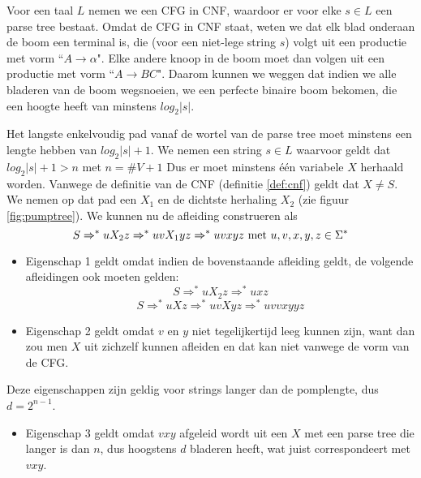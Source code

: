  Voor een taal $L$ nemen we een CFG in CNF, waardoor er voor elke $s \in L$ een parse tree bestaat. Omdat de CFG in CNF staat, weten we dat elk blad onderaan de boom een terminal is, die (voor een niet-lege string $s$) volgt uit een productie met vorm ``$A \rightarrow \alpha$". Elke andere knoop in de boom moet dan volgen uit een productie met vorm ``$A \rightarrow BC$". Daarom kunnen we weggen dat indien we alle bladeren van de boom wegsnoeien, we een perfecte binaire boom bekomen, die een hoogte heeft van minstens $log_2|s|$.
  
  Het langste enkelvoudig pad vanaf de wortel van de parse tree moet minstens een lengte hebben van $log_2|s| + 1$. We nemen een string $s \in L$ waarvoor geldt dat $log_2|s| + 1 > n$ met $n = \#V + 1$ Dus er moet minstens \'e\'en variabele $X$ herhaald worden. Vanwege de definitie van de CNF (definitie \ref{def:cnf}) geldt dat $X \neq S$. We nemen op dat pad een $X_1$ en de dichtste herhaling $X_2$ (zie figuur \ref{fig:pumptree}). We kunnen nu de afleiding construeren als
  \begin{equation*}
  S \Rightarrow^* uX_2z \Rightarrow^* uvX_1yz \Rightarrow^* uvxyz \text{ met }u,v,x,y,z \in \Sigma^*
  \end{equation*}
  
  \begin{itemize}
  \item Eigenschap 1 geldt omdat indien de bovenstaande afleiding geldt, de volgende afleidingen ook moeten gelden:
  \begin{equation*}
  S \Rightarrow^* uX_2z \Rightarrow^* uxz
  \end{equation*}
  \begin{equation*}
  S \Rightarrow^* uXz \Rightarrow^* uvXyz \Rightarrow^* uvvxyyz
  \end{equation*}
  \item Eigenschap 2 geldt omdat $v$ en $y$ niet tegelijkertijd leeg kunnen zijn, want dan zou men $X$ uit zichzelf kunnen afleiden en dat kan niet vanwege de vorm van de CFG.
  \end{itemize}
  
  Deze eigenschappen zijn geldig voor strings langer dan de pomplengte, dus $d = 2^{n-1}$.
  
  \begin{itemize}
  \item Eigenschap 3 geldt omdat $vxy$ afgeleid wordt uit een $X$ met een parse tree die langer is dan $n$, dus hoogstens $d$ bladeren heeft, wat juist correspondeert met $vxy$.
  \end{itemize}